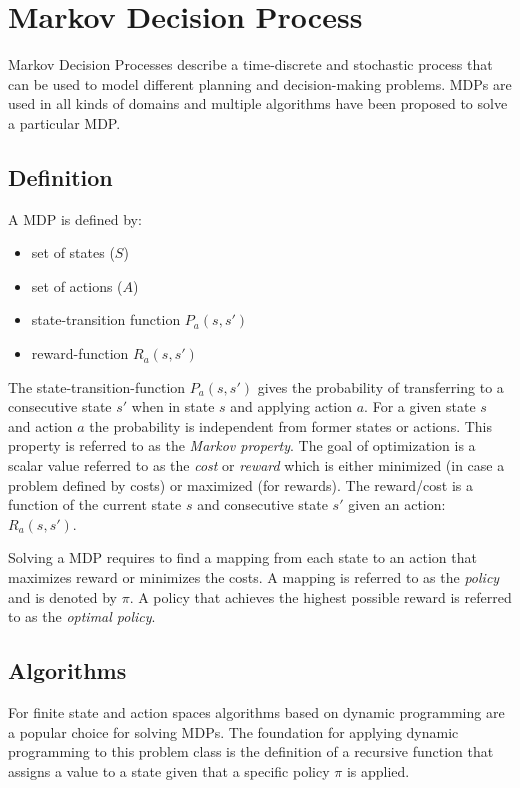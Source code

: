 \chapter{Markov Decision Process}

Markov Decision Processes describe a time-discrete and stochastic process that can be used to model different planning and decision-making problems. MDPs are used in all kinds of domains and multiple algorithms have been proposed to solve a particular MDP. 

\section{Definition}

A MDP is defined by:

\begin{itemize}
	\item set of states ($S$)
	\item set of actions ($A$)
	\item state-transition function $P_a(s,s')$
	\item reward-function $R_a(s,s')$
\end{itemize}
The state-transition-function $P_a(s,s')$ gives the probability of transferring to a consecutive state $s'$ when in state $s$ and applying action $a$. For a given state $s$ and action $a$ the probability is independent from former states or actions. This property is referred to as the \emph{Markov property}. The goal of optimization is a scalar value referred to as the \emph{cost} or \emph{reward} which is either minimized (in case a problem defined by costs) or maximized (for rewards). The reward/cost is a function of the current state $s$ and consecutive state $s'$ given an action: $R_a(s,s')$. 

Solving a MDP requires to find a mapping from each state to an action that maximizes reward or minimizes the costs. A mapping is referred to as the \emph{policy} and is denoted by $\pi$. A policy that achieves the highest possible reward is referred to as the \emph{optimal policy}. 

\section{Algorithms}

For finite state and action spaces algorithms based on dynamic programming are a popular choice for solving MDPs. 
The foundation for applying dynamic programming to this problem class is the definition of a recursive function that assigns a value to a state given that a specific policy $\pi$ is applied.  

